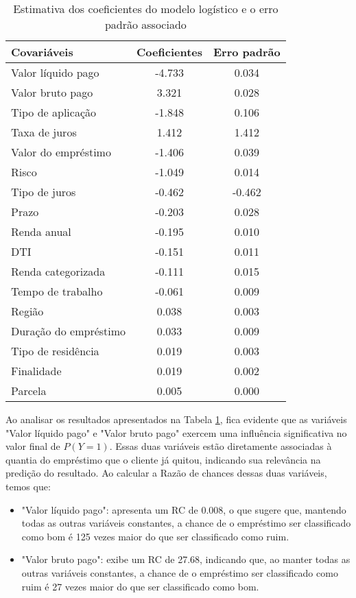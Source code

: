 \begin{table}[H]
\centering
\begin{tabular}{lcc}
  \toprule
    \textbf{Covariáveis} & \textbf{Coeficientes} &  \textbf{Erro padrão} \\
  \midrule
        Valor líquido pago & -4.733 &  0.034 \\
        Valor bruto pago &  3.321 &  0.028 \\
        Tipo de aplicação & -1.848 &  0.106 \\
        Taxa de juros &  1.412 &  1.412 \\
        Valor do empréstimo & -1.406 &  0.039 \\
        Risco & -1.049 &  0.014 \\
        Tipo de juros & -0.462 &  -0.462  \\
        Prazo & -0.203 &  0.028 \\
        Renda anual & -0.195 &  0.010 \\
        DTI & -0.151 &  0.011 \\
        Renda categorizada & -0.111 &  0.015 \\
        Tempo de trabalho & -0.061 &  0.009 \\
        Região &  0.038 &  0.003\\
        Duração do empréstimo &  0.033 &  0.009 \\
        Tipo de residência &  0.019 &  0.003 \\
        Finalidade &  0.019 &  0.002  \\
        Parcela &  0.005 &  0.000  \\
  \bottomrule
\end{tabular}
\caption{Estimativa dos coeficientes do modelo logístico e o erro padrão associado}
\label{tab:result_model_logist}
\end{table}

Ao analisar os resultados apresentados na Tabela \ref{tab:result_model_logist}, fica evidente
que as variáveis "Valor líquido pago" e "Valor bruto pago" exercem uma influência significativa no valor final de $P(Y=1)$.
Essas duas variáveis estão diretamente associadas à quantia do empréstimo que o cliente já quitou, 
indicando sua relevância na predição do resultado. Ao calcular a Razão de chances dessas duas variáveis, temos que:


\begin{itemize}
  \item "Valor líquido pago": apresenta um RC de 0.008, o que sugere que, mantendo todas as outras variáveis constantes, a chance de o empréstimo ser classificado como bom é 125 vezes maior do que ser classificado como ruim.
  \item "Valor bruto pago": exibe um RC de 27.68, indicando que, ao manter todas as outras variáveis constantes, a chance de o empréstimo ser classificado como ruim é 27 vezes maior do que ser classificado como bom.
\end{itemize}


